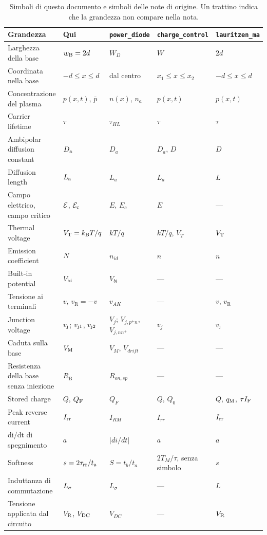 \documentclass[10pt,a4paper]{scrartcl}
\let\newcommand\pdvaluedefine
\newcommand{\IF}{I_\mathrm{F}}
\newcommand{\VR}{V_\mathrm{R}}
\newcommand{\Irr}{I_\mathrm{rr}}
\newcommand{\ta}{t_\mathrm{a}}
\newcommand{\taurr}{\tau_\mathrm{rr}}
\newcommand{\qM}{q_\mathrm{M}}
\newcommand{\vj}{v_\mathrm{j}}
\newcommand{\vjo}{v_\mathrm{j1}}
\newcommand{\vjt}{v_\mathrm{j2}}
\newcommand{\VT}{V_\mathrm{T}}
\newcommand{\Nem}{N}                          %
\newcommand{\Ls}{L_\sigma}                    %
\newcommand{\Ef}{\mathcal{E}}                 %
\newcommand{\Ec}{\mathcal{E}_\mathrm{c}}      %
\newcommand{\wB}{w_\mathrm{B}}
\newcommand{\Da}{D_\mathrm{a}}
\newcommand{\La}{L_\mathrm{a}}
\newcommand{\VM}{V_\mathrm{M}}
\newcommand{\Vbi}{V_\mathrm{bi}}
\newcommand{\Vdc}{V_\mathrm{DC}}
\newcommand{\QF}{Q_\mathrm{F}}
\newcommand{\kB}{k_\mathrm{B}}
\begin{document}
\begin{table}[htb]
\centering\small
\caption{Simboli di questo documento e simboli delle note di origine. Un trattino indica che la grandezza non compare nella nota.}
\label{tab:origin}
\begin{tabular}{@{}>{\raggedright\arraybackslash}p{4.3cm}llll@{}}
\toprule
Grandezza & Qui & \texttt{power\_diode} & \texttt{charge\_control} & \texttt{lauritzen\_ma} \\
\midrule
Larghezza della base & $\wB = 2d$ & $W_D$ & $W$ & $2d$ \\
Coordinata nella base & $-d \leq x \leq d$ & dal centro & $x_1 \leq x \leq x_2$ & $-d \leq x \leq d$ \\
Concentrazione del plasma & $p(x,t)$, $\bar p$ & $n(x)$, $n_a$ & $p(x,t)$ & $p(x,t)$ \\
Carrier lifetime & $\tau$ & $\tau_{HL}$ & $\tau$ & $\tau$ \\
Ambipolar diffusion constant & $\Da$ & $D_a$ & $D_a$, $D$ & $D$ \\
Diffusion length & $\La$ & $L_a$ & $L_a$ & $L$ \\
Campo elettrico, campo critico & $\Ef$, $\Ec$ & $E$, $E_c$ & $E$ & --- \\
Thermal voltage & $\VT = \kB T/q$ & $kT/q$ & $kT/q$, $V_T$ & $\VT$ \\
Emission coefficient & $\Nem$ & $n_{id}$ & $n$ & $n$ \\
Built-in potential & $\Vbi$ & $V_{bi}$ & --- & --- \\
Tensione ai terminali & $v$, $v_\mathrm{R} = -v$ & $v_{AK}$ & --- & $v$, $v_\mathrm{R}$ \\ Junction voltage & $\vj$; $\vjo$, $\vjt$ & $V_j$; $V_{j,p^+n}$, $V_{j,nn^+}$ & $v_j$ & $\vj$ \\
Caduta sulla base & $\VM$ & $V_M$, $V_{drift}$ & --- & --- \\
Resistenza della base senza iniezione & $R_\mathrm{B}$ & $R_{on,sp}$ & --- & --- \\
Stored charge & $Q$, $\QF$ & $Q_F$ & $Q$, $Q_0$ & $Q$, $\qM$, $\tau\IF$ \\
Peak reverse current & $\Irr$ & $I_{RM}$ & $I_{rr}$ & $\Irr$ \\
di/dt di spegnimento & $a$ & $|di/dt|$ & $a$ & $a$ \\
Softness & $s = 2\taurr/\ta$ & $S = t_b/t_a$ & $2T_M/\tau$, senza simbolo & $s$ \\
Induttanza di commutazione & $\Ls$ & $L_\sigma$ & --- & $L$ \\
Tensione applicata dal circuito & $\VR$, $\Vdc$ & $V_{DC}$ & --- & $\VR$ \\

\end{tabular}
\end{table}
\end{document}
